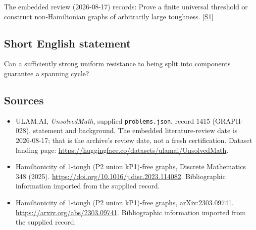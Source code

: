 \documentclass[11pt,a4paper]{article}
\newcommand{\sref}[2]{\hyperlink{source:#1:#2}{[S#2]}}
\begin{document}
The embedded review (2026-08-17) records: Prove a finite universal threshold or construct non-Hamiltonian graphs of arbitrarily large toughness. \sref{1415}{1}

\subsection{Short English statement}

Can a sufficiently strong uniform resistance to being split into components guarantee a spanning cycle?

\subsection{Sources}

{\small

\begin{itemize}

\item[\hypertarget{source:1415:1}{S1}] ULAM.AI, \emph{UnsolvedMath}, supplied \texttt{problems.json}, record 1415 (GRAPH-028), statement and background. The embedded literature-review date is 2026-08-17; that is the archive’s review date, not a fresh certification. Dataset landing page: \url{https://huggingface.co/datasets/ulamai/UnsolvedMath}.

\item[\hypertarget{source:1415:2}{S2}] Hamiltonicity of 1-tough (P2 union kP1)-free graphs, Discrete Mathematics 348 (2025). \url{https://doi.org/10.1016/j.disc.2023.114082}. Bibliographic information imported from the supplied record.

\item[\hypertarget{source:1415:3}{S3}] Hamiltonicity of 1-tough (P2 union kP1)-free graphs, arXiv:2303.09741. \url{https://arxiv.org/abs/2303.09741}. Bibliographic information imported from the supplied record.

\end{itemize}

}

\label{end:1415}
\end{document}
